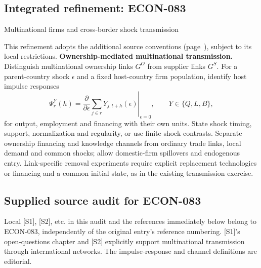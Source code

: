 \documentclass[11pt,a4paper]{article}
\begin{document}
\subsection*{Integrated refinement: ECON-083}
{\sffamily\small\color{muted}Multinational firms and cross-border shock transmission\par}
This refinement adopts the additional source conventions
(page~\pageref{audited:conventions}), subject to its local restrictions.
\textbf{Ownership-mediated multinational transmission.}
Distinguish multinational ownership links $G^O$ from supplier links $G^S$.
For a parent-country shock $\epsilon$ and a fixed host-country firm population,
identify host impulse responses
\[
\Psi_r^Y(h)=\left.\frac{\partial}{\partial\epsilon}
                \sum_{j\in r}Y_{j,t+h}(\epsilon)\right|_{\epsilon=0},
\qquad Y\in\{Q,L,B\},
\]
for output, employment and financing with their own units. State shock timing,
support, normalization and regularity, or use finite shock contrasts. Separate
ownership financing and knowledge channels from ordinary trade links, local
demand and common shocks; allow domestic-firm spillovers and endogenous entry.
Link-specific removal experiments require explicit replacement technologies or
financing and a common initial state, as in the existing transmission exercise.
\subsection*{Supplied source audit for ECON-083}
Local [S1], [S2], etc. in this audit and the references immediately below
belong to ECON-083, independently of the original entry's reference numbering.
[S1]'s open-questions chapter and [S2] explicitly support multinational transmission through international networks. The impulse-response and channel definitions are editorial.
\end{document}
